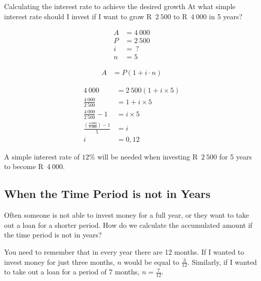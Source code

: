 \begin{wex}{Calculating the interest rate to achieve the desired growth}{
    At what simple interest rate should I invest if I want to grow R~$2~500$ to R~$4~000$ in 5 years?}{

    \begin{align*}
	A &= 4~000\\
	P &= 2~500\\
	i &= ~?\\
	n &= 5
    \end{align*}

    \begin{align*}
	A &= P(1 + i \cdot n)
    \end{align*}

    \begin{align*}
	4~000 &= 2~500(1 + i \times 5)\\
	\frac{4~000}{2~500} &= 1 + i \times 5\\
	\frac{4~000}{2~500} - 1&= i \times 5\\
	\frac{(\frac{4~000}{2~500}) - 1}{5} &= i\\
	i &= 0,12
    \end{align*}

    A simple interest rate of $12\%$ will be needed when investing R~$2~500$ for 5 years to become R~$4~000$.
    }
\end{wex}


\subsection{When the Time Period is not in Years}

Often someone is not able to invest money for a full year, or they want to take out a loan for a shorter period. How do we calculate the accumulated amount if the time period is not in years?\par

You need to remember that in every year there are 12 months. If I wanted to invest money for just three months, $n$ would be equal to $\frac{3}{12}$. Similarly, if I wanted to take out a loan for a period of 7 months, $n = \frac{7}{12}$.\\


